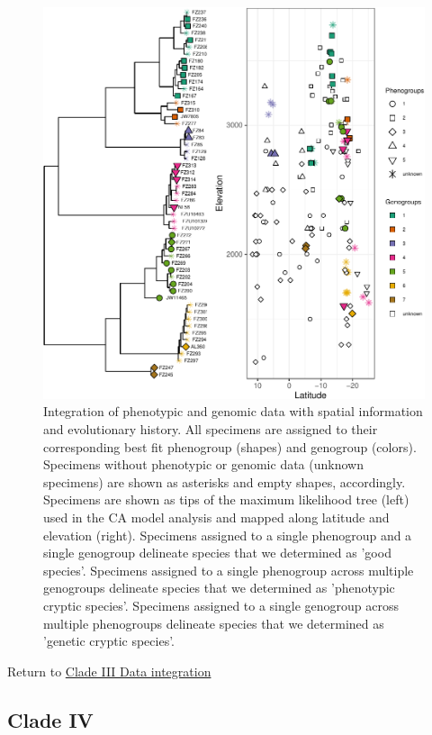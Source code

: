 \documentclass[
  11pt,
]{article}
\begin{document}
\begin{figure}
\includegraphics{Supplementary_Material_files/figure-latex/cladeIIIfinalDelimitation2-1} \caption{Integration of phenotypic and genomic data with spatial information and evolutionary history. All specimens are assigned to their corresponding best fit phenogroup (shapes) and genogroup (colors). Specimens without phenotypic or genomic data (unknown specimens) are shown as asterisks and empty shapes, accordingly. Specimens are shown as tips of the maximum likelihood tree (left) used in the CA model analysis and mapped along latitude and elevation (right). Specimens assigned to a single phenogroup and a single genogroup delineate species that we determined as 'good species'. Specimens assigned to a single phenogroup across multiple genogroups delineate species that we determined as 'phenotypic cryptic species'. Specimens assigned to a single genogroup across multiple phenogroups delineate species that we determined as 'genetic cryptic species'.}\label{fig:cladeIIIfinalDelimitation2}
\end{figure}

Return to \protect\hyperlink{data-integration-3}{Clade III Data integration}
\pagebreak

\hypertarget{clade-iv-2}{%
\subsection{Clade IV}\label{clade-iv-2}}
\end{document}
